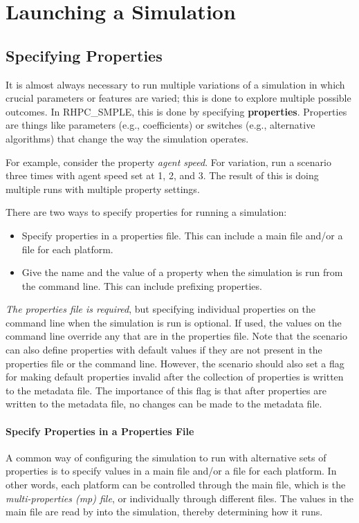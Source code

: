 
\chapter{Launching a Simulation}
\label{chap:LaunchingASimulation}	

\section{Specifying Properties}
It is almost always necessary to run multiple variations of a simulation in which crucial parameters or features are varied; this is done to explore multiple possible outcomes. In RHPC\_SMPLE, this is done by specifying \textbf{properties}. Properties are things like parameters (e.g., coefficients) or switches (e.g., alternative algorithms) that change the way the simulation operates.
\par For example, consider the property \textit{agent speed}. 
For variation, run a scenario three times with agent speed set at 1, 2, and 3. 
The result of this is doing multiple runs with multiple property settings. 

There are two ways to specify properties for running a simulation:
  \begin{itemize} 
  	\item Specify properties in a properties file. This can include a main file and/or a file for each platform.
	\item Give the name and the value of a property when the simulation is run from the command line. This can include prefixing properties. 
\end{itemize}

\emph{The properties file is required}, but specifying individual properties on the command line when the simulation is run is optional.
If used, the values on the command line override any that are in the properties file. Note that the scenario can also define properties with default values if they are not present in the properties file or the command line. However, the scenario should also set a flag for making default properties invalid after the collection of properties is written to the metadata file. The importance of this flag is that after properties are written to the metadata file, no changes can be made to the metadata file. 
	
\subsubsection{Specify Properties in a Properties File}
A common way of configuring the simulation to run with alternative sets of properties is to specify values in a main file and/or a file for each platform. 
In other words, each platform can be controlled through the main file, which is the \textit{multi-properties (mp) file}, or individually through different files.
The values in the main file are read by \rhpc into the simulation, thereby determining how it runs.  



